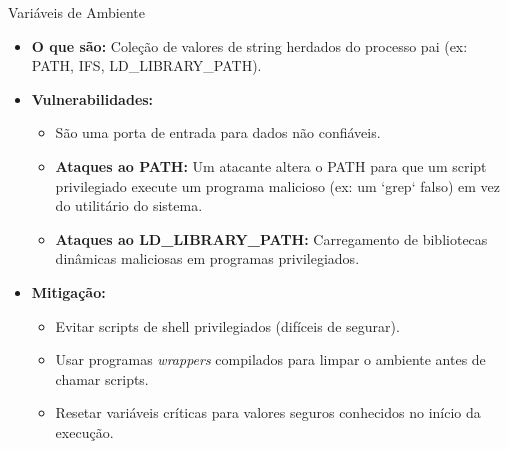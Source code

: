 \begin{frame}{Variáveis de Ambiente}
    \begin{itemize}
        \item \textbf{O que são:} Coleção de valores de string herdados do processo pai (ex: PATH, IFS, LD\_LIBRARY\_PATH).

        \item \textbf{Vulnerabilidades:}
              \begin{itemize}
                  \item São uma porta de entrada para dados não confiáveis.
                  \item \textbf{Ataques ao PATH:} Um atacante altera o PATH para que um script privilegiado execute um programa malicioso (ex: um `grep` falso) em vez do utilitário do sistema.
                  \item \textbf{Ataques ao LD\_LIBRARY\_PATH:} Carregamento de bibliotecas dinâmicas maliciosas em programas privilegiados.
              \end{itemize}

        \item \textbf{Mitigação:}
              \begin{itemize}
                  \item Evitar scripts de shell privilegiados (difíceis de segurar).
                  \item Usar programas \textit{wrappers} compilados para limpar o ambiente antes de chamar scripts.
                  \item Resetar variáveis críticas para valores seguros conhecidos no início da execução.
              \end{itemize}
    \end{itemize}
\end{frame}

